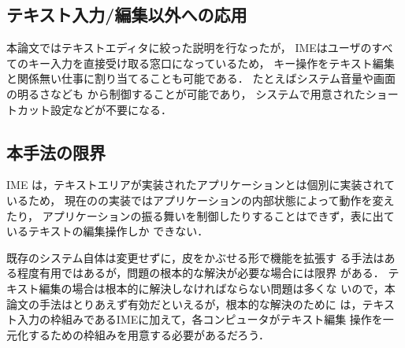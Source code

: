 \subsection{テキスト入力/編集以外への応用}

本論文ではテキストエディタに絞った説明を行なったが，
IMEはユーザのすべてのキー入力を直接受け取る窓口になっているため，
キー操作をテキスト編集と関係無い仕事に割り当てることも可能である．
%
たとえばシステム音量や画面の明るさなども
{\system}から制御することが可能であり，
システムで用意されたショートカット設定などが不要になる．

\subsection{本手法の限界}

IME は，テキストエリアが実装されたアプリケーションとは個別に実装されているため，
現在の{\system}の実装ではアプリケーションの内部状態によって動作を変えたり，
アプリケーションの振る舞いを制御したりすることはできず，表に出ているテキストの編集操作しか
できない．

%
既存のシステム自体は変更せずに，皮をかぶせる形で機能を拡張す
る手法はある程度有用ではあるが，問題の根本的な解決が必要な場合には限界
がある．
%
テキスト編集の場合は根本的に解決しなければならない問題は多くな
いので，本論文の手法はとりあえず有効だといえるが，根本的な解決のために
は，テキスト入力の枠組みであるIMEに加えて，各コンピュータがテキスト編集
操作を一元化するための枠組みを用意する必要があるだろう．
